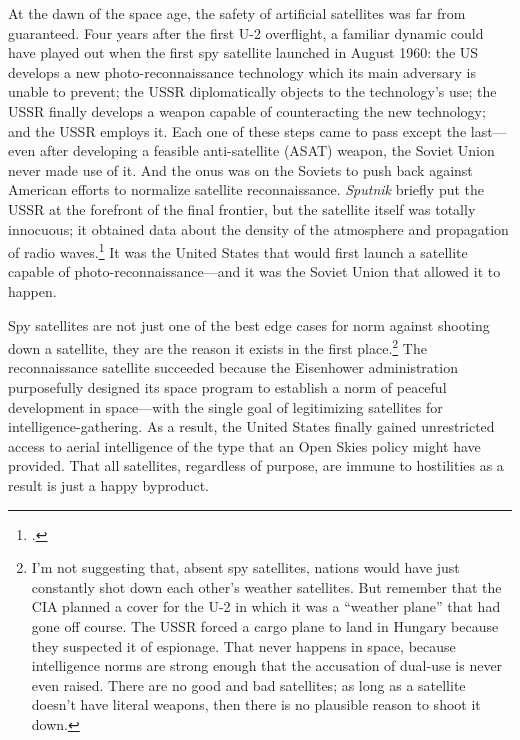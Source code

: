 \documentclass[11pt]{memoir}
\begin{document}
At the dawn of the space age, the safety of artificial satellites was far from guaranteed. Four years after the first U-2 overflight, a familiar dynamic could have played out when the first spy satellite launched in August 1960: the US develops a new photo-reconnaissance technology which its main adversary is unable to prevent; the USSR diplomatically objects to the technology's use; the USSR finally develops a weapon capable of counteracting the new technology; and the USSR employs it. Each one of these steps came to pass except the last---even after developing a feasible anti-satellite (ASAT) weapon, the Soviet Union never made use of it. And the onus was on the Soviets to push back against American efforts to normalize satellite reconnaissance. \emph{Sputnik} briefly put the USSR at the forefront of the final frontier, but the satellite itself was totally innocuous; it obtained data about the density of the atmosphere and propagation of radio waves.\footcite{nasa_sputnik_2019} It was the United States that would first launch a satellite capable of photo-reconnaissance---and it was the Soviet Union that allowed it to happen.

Spy satellites are not just one of the best edge cases for norm against shooting down a satellite, they are the reason it exists in the first place.\footnote{I'm not suggesting that, absent spy satellites, nations would have just constantly shot down each other's weather satellites. But remember that the CIA planned a cover for the U-2 in which it was a ``weather plane'' that had gone off course. The USSR forced a cargo plane to land in Hungary because they suspected it of espionage. That never happens in space, because intelligence norms are strong enough that the accusation of dual-use is never even raised. There are no good and bad satellites; as long as a satellite doesn't have literal weapons, then there is no plausible reason to shoot it down.} The reconnaissance satellite succeeded because the Eisenhower administration purposefully designed its space program to establish a norm of peaceful development in space---with the single goal of legitimizing satellites for intelligence-gathering. As a result, the United States finally gained unrestricted access to aerial intelligence of the type that an Open Skies policy might have provided. That all satellites, regardless of purpose, are immune to hostilities as a result is just a happy byproduct.
\end{document}
